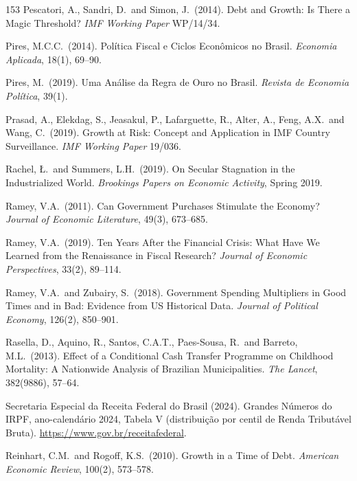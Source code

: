 \documentclass[11pt,a4paper]{article}
\begin{document}
\begin{thebibliography}{153}
 Pescatori, A., Sandri, D.\ and Simon, J.\ (2014). Debt and Growth: Is There a Magic Threshold? \textit{IMF Working Paper} WP/14/34.

 Pires, M.C.C.\ (2014). Pol\'itica Fiscal e Ciclos Econ\^omicos no Brasil. \textit{Economia Aplicada}, 18(1), 69--90.

 Pires, M.\ (2019). Uma An\'alise da Regra de Ouro no Brasil. \textit{Revista de Economia Pol\'itica}, 39(1).

 Prasad, A., Elekdag, S., Jeasakul, P., Lafarguette, R., Alter, A., Feng, A.X.\ and Wang, C.\ (2019). Growth at Risk: Concept and Application in IMF Country Surveillance. \textit{IMF Working Paper} 19/036.

 Rachel, {\L}.\ and Summers, L.H.\ (2019). On Secular Stagnation in the Industrialized World. \textit{Brookings Papers on Economic Activity}, Spring 2019.

 Ramey, V.A.\ (2011). Can Government Purchases Stimulate the Economy? \textit{Journal of Economic Literature}, 49(3), 673--685.

 Ramey, V.A.\ (2019). Ten Years After the Financial Crisis: What Have We Learned from the Renaissance in Fiscal Research? \textit{Journal of Economic Perspectives}, 33(2), 89--114.

 Ramey, V.A.\ and Zubairy, S.\ (2018). Government Spending Multipliers in Good Times and in Bad: Evidence from US Historical Data. \textit{Journal of Political Economy}, 126(2), 850--901.

 Rasella, D., Aquino, R., Santos, C.A.T., Paes-Sousa, R.\ and Barreto, M.L.\ (2013). Effect of a Conditional Cash Transfer Programme on Childhood Mortality: A Nationwide Analysis of Brazilian Municipalities. \textit{The Lancet}, 382(9886), 57--64.

 Secretaria Especial da Receita Federal do Brasil (2024). Grandes N\'umeros do IRPF, ano-calend\'ario 2024, Tabela V (distribui\c{c}\~ao por centil de Renda Tribut\'avel Bruta). \url{https://www.gov.br/receitafederal}.

 Reinhart, C.M.\ and Rogoff, K.S.\ (2010). Growth in a Time of Debt. \textit{American Economic Review}, 100(2), 573--578.


\end{thebibliography}
\end{document}
